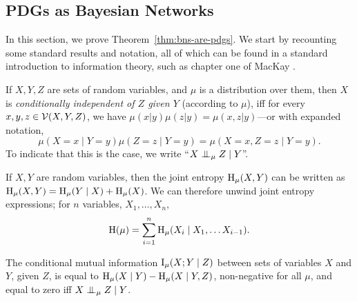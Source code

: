 	\subsection{PDGs as Bayesian Networks}
In this section, we prove Theorem~\ref{thm:bns-are-pdgs}.  
We start by recounting some standard results and notation, all of which can be found in a standard introduction to information theory, such as chapter one of MacKay \cite{mackay2003information}. 
\begin{defn}\label{defn:cond-indep}
	If $X,Y,Z$ are sets of random variables, and $\mu$ is a distribution over them,
	then $X$ is \emph{conditionally independent of $Z$ given $Y$} (according to $\mu$), iff for every $x,y,z \in \mathcal V(X,Y,Z)$, we have $\mu(x|y) \mu(z|y) = \mu(x,z|y)$---or with expanded notation, 
	\[ \mu(X=x\mid Y=y)\mu(Z=z\mid Y=y) = \mu(X=x,Z=z \mid Y=y). \]
	To indicate that this is the case, we write ``$X \mathrel{\perp\mspace{-10mu}\perp}_\mu Z \mid Y$''.
\end{defn}
\begin{fact}\label{fact:entropy-chain-rule}
	If $X,Y$ are random variables, then the joint entropy $\operatorname{\mathrm{H}}_\mu(X, Y)$ can be written as $\operatorname{\mathrm{H}}_\mu(X,Y) = \operatorname{\mathrm{H}}_\mu(Y \mid X) + \operatorname{\mathrm{H}}_\mu(X)$. We can therefore unwind joint entropy expressions; for $n$ variables, $X_1, \ldots, X_n$, 
	\[ \operatorname{\mathrm{H}}(\mu) = \sum_{i = 1}^n \operatorname{\mathrm{H}}_\mu(X_i \mid X_1, \ldots X_{i-1}). \]
\end{fact}
\begin{fact}\label{fact:cmi}
	The conditional mutual information $\operatorname{\mathrm{I}}_\mu(X ; Y \mid Z)$ between sets of variables $X$ and $Y$, given $Z$, is equal to $\operatorname{\mathrm{H}}_\mu(X \mid Y) - \operatorname{\mathrm{H}}_\mu(X \mid Y, Z)$, non-negative for all $\mu$, and equal to zero iff $X \mathrel{\perp\mspace{-10mu}\perp}_\mu Z \mid Y$.
\end{fact}

